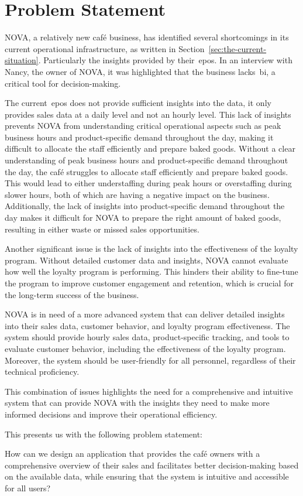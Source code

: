 \section{Problem Statement}\label{sec:problem-statement}

NOVA, a relatively new café business, has identified several shortcomings in its current operational infrastructure,
as written in Section~\ref{sec:the-current-situation}.
Particularly the insights provided by their~\acrfull{epos}.
In an interview with Nancy, the owner of NOVA, it was highlighted that the business lacks~\acrfull{bi}, a critical tool
for decision-making.

The current~\acrshort{epos} does not provide sufficient insights into the data, it only provides sales data at a daily
level and not an hourly level.
This lack of insights prevents NOVA from understanding critical operational aspects such as peak business hours and
product-specific demand throughout the day, making it difficult to allocate the staff efficiently and prepare baked
goods.
Without a clear understanding of peak business hours and product-specific demand throughout the day, the café struggles
to allocate staff efficiently and prepare baked goods.
This would lead to either understaffing during peak hours or overstaffing during slower hours, both of which are
having a negative impact on the business.
Additionally, the lack of insights into product-specific demand throughout the day makes it difficult for NOVA to
prepare the right amount of baked goods, resulting in either waste or missed sales opportunities.

Another significant issue is the lack of insights into the effectiveness of the loyalty program.
Without detailed customer data and insights, NOVA cannot evaluate how well the loyalty program is performing.
This hinders their ability to fine-tune the program to improve customer engagement and retention, which is crucial for
the long-term success of the business.

NOVA is in need of a more advanced system that can deliver detailed insights into their sales data, customer behavior,
and loyalty program effectiveness.
The system should provide hourly sales data, product-specific tracking, and tools to evaluate customer behavior,
including the effectiveness of the loyalty program.
Moreover, the system should be user-friendly for all personnel, regardless of their technical proficiency.

This combination of issues highlights the need for a comprehensive and intuitive system that can provide NOVA with the
insights they need to make more informed decisions and improve their operational efficiency.

This presents us with the following problem statement:
\begin{tcolorbox}[title=Problem statement]
    How can we design an application that provides the café owners with a comprehensive overview of their sales and
    facilitates better decision-making based on the available data, while ensuring that the system is intuitive and
    accessible for all users?
\end{tcolorbox}
